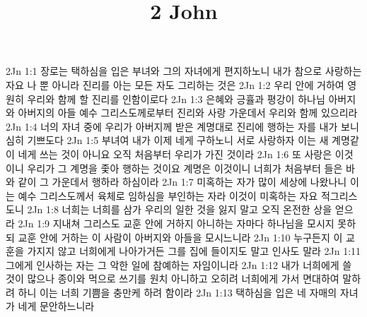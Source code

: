 

\title{2 John}

2Jn 1:1  장로는 택하심을 입은 부녀와 그의 자녀에게 편지하노니 내가 참으로 사랑하는 자요 나 뿐 아니라 진리를 아는 모든 자도 그리하는 것은
2Jn 1:2  우리 안에 거하여 영원히 우리와 함께 할 진리를 인함이로다
2Jn 1:3  은혜와 긍휼과 평강이 하나님 아버지와 아버지의 아들 예수 그리스도께로부터 진리와 사랑 가운데서 우리와 함께 있으리라
2Jn 1:4  너의 자녀 중에 우리가 아버지께 받은 계명대로 진리에 행하는 자를 내가 보니 심히 기쁘도다
2Jn 1:5  부녀여 내가 이제 네게 구하노니 서로 사랑하자 이는 새 계명같이 네게 쓰는 것이 아니요 오직 처음부터 우리가 가진 것이라
2Jn 1:6  또 사랑은 이것이니 우리가 그 계명을 좇아 행하는 것이요 계명은 이것이니 너희가 처음부터 들은 바와 같이 그 가운데서 행하라 하심이라
2Jn 1:7  미혹하는 자가 많이 세상에 나왔나니 이는 예수 그리스도께서 육체로 임하심을 부인하는 자라 이것이 미혹하는 자요 적그리스도니
2Jn 1:8  너희는 너희를 삼가 우리의 일한 것을 잃지 말고 오직 온전한 상을 얻으라
2Jn 1:9  지내쳐 그리스도 교훈 안에 거하지 아니하는 자마다 하나님을 모시지 못하되 교훈 안에 거하는 이 사람이 아버지와 아들을 모시느니라
2Jn 1:10  누구든지 이 교훈을 가지지 않고 너희에게 나아가거든 그를 집에 들이지도 말고 인사도 말라
2Jn 1:11  그에게 인사하는 자는 그 악한 일에 참예하는 자임이니라
2Jn 1:12  내가 너희에게 쓸 것이 많으나 종이와 먹으로 쓰기를 원치 아니하고 오히려 너희에게 가서 면대하여 말하려 하니 이는 너희 기쁨을 충만케 하려 함이라
2Jn 1:13  택하심을 입은 네 자매의 자녀가 네게 문안하느니라


